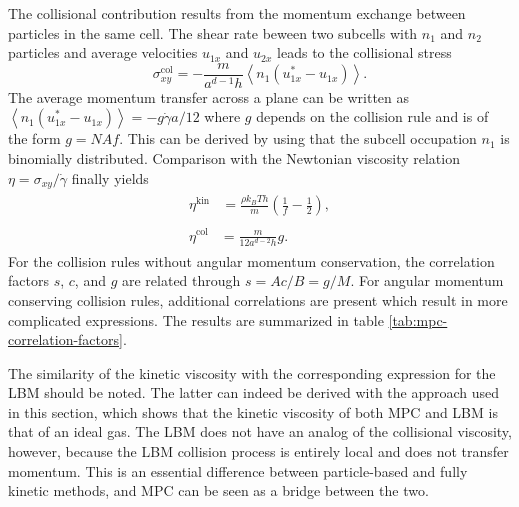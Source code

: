 \documentclass[8.5pt,twoside,twocolumn]{article}
\begin{document}
The collisional contribution results from the momentum exchange between particles in the same cell. The shear rate beween two subcells with $n_1$ and $n_2$ particles and average velocities $u_{1x}$ and $u_{2x}$ leads to the collisional stress
%
%
%
\begin{equation}
\sigma^\text{col}_{xy} = - \frac{m}{a^{d-1} h} \left\langle n_1 \left( u_{1x}^* - u_{1x} \right) \right\rangle .
\end{equation}
%
The average momentum transfer across a plane can be written as $\left\langle n_1 \left( u_{1x}^* - u_{1x} \right) \right\rangle = - g \dot{\gamma} a/12$ where $g$ depends on the collision rule and is of the form $g=NAf$. This can be derived by using that the subcell occupation $n_1$ is binomially distributed.\cite{Kikuchi:2003} Comparison with the Newtonian viscosity relation $\eta=\sigma_{xy}/\dot{\gamma}$ finally yields
%
\begin{align}
  \begin{split}
    \eta^\text{kin} &= \frac{\rho k_BT h}{m} \left( \frac{1}{f} - \frac{1}{2} \right) ,
  \end{split}\\
  \begin{split}
  \eta^\text{col} &= \frac{m}{12 a^{d-2} h} g .
  \end{split}
\end{align}
%
For the collision rules without angular momentum conservation, the correlation factors $s$, $c$, and $g$ are related through $s = Ac/B = g/M$. For angular momentum conserving collision rules, additional correlations are present which result in more complicated expressions. The results are summarized in table \ref{tab:mpc-correlation-factors}.

The similarity of the kinetic viscosity with the corresponding expression for the LBM should be noted. The latter can indeed be derived with the approach used in this section, which shows that the kinetic viscosity of both MPC and LBM is that of an ideal gas. The LBM does not have an analog of the collisional viscosity, however, because the LBM collision process is entirely local and does not transfer momentum. This is an essential difference between particle-based and fully kinetic methods, and MPC can be seen as a bridge between the two.
\end{document}
